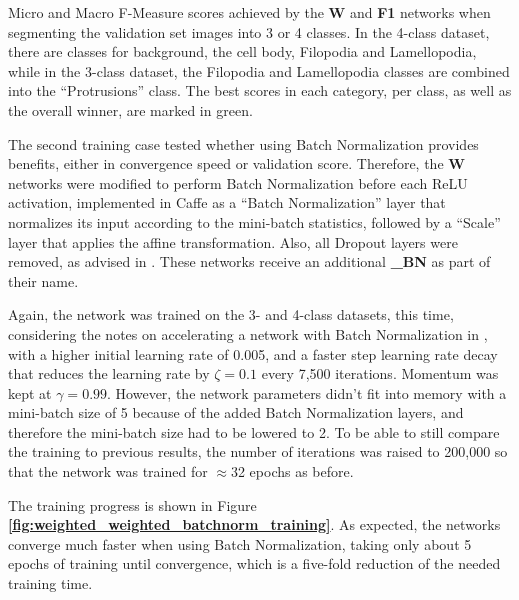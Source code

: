 \begin {table}
\caption[Micro and Macro F-Measure scores for networks with weighted Cross-Entropy and F-Measure loss functions.]{Micro and Macro F-Measure scores achieved by the \textbf{W} and \textbf{F1} networks when segmenting the validation set images into 3 or 4 classes. In the 4-class dataset, there are classes for background, the cell body, Filopodia and Lamellopodia, while in the 3-class dataset, the Filopodia and Lamellopodia classes are combined into the ``Protrusions'' class. The best scores in each category, per class, as well as the overall winner, are marked in green.}
\label{tab:results1}
\end {table}

\noindent The second training case tested whether using Batch Normalization provides benefits, either in convergence speed or validation score. Therefore, the \textbf{W} networks were modified to perform Batch Normalization before each ReLU activation, implemented in Caffe as a ``Batch Normalization'' layer that normalizes its input according to the mini-batch statistics, followed by a ``Scale'' layer that applies the affine transformation. Also, all Dropout layers were removed, as advised in \cite{batchnorm}. These networks receive an additional \textbf{\_BN} as part of their name.

Again, the network was trained on the 3- and 4-class datasets, this time, considering the notes on accelerating a network with Batch Normalization in \cite{batchnorm}, with a higher initial learning rate of 0.005, and a faster step learning rate decay that reduces the learning rate by $\zeta = 0.1$ every 7,500 iterations. Momentum was kept at $\gamma = 0.99$. However, the network parameters didn't fit into memory with a mini-batch size of 5 because of the added Batch Normalization layers, and therefore the mini-batch size had to be lowered to 2. To be able to still compare the training to previous results, the number of iterations was raised to 200,000 so that the network was trained for $\approx$32 epochs as before.

The training progress is shown in Figure \textbf{\ref{fig:weighted_weighted_batchnorm_training}}. As expected, the networks converge much faster when using Batch Normalization, taking only about 5 epochs of training until convergence, which is a five-fold reduction of the needed training time.\\


